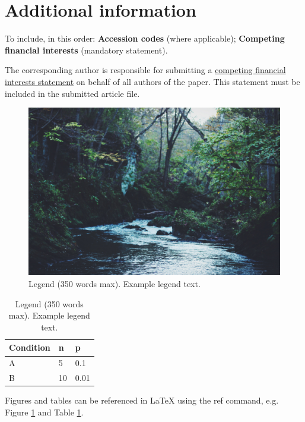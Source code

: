 \documentclass[fleqn,10pt]{./class/wlscirep}
\begin{document}
\section*{Additional information}

To include, in this order: \textbf{Accession codes} (where applicable); \textbf{Competing financial interests} (mandatory statement). 

The corresponding author is responsible for submitting a \href{http://www.nature.com/srep/policies/index.html#competing}{competing financial interests statement} on behalf of all authors of the paper. This statement must be included in the submitted article file.

\begin{figure}[ht]
\centering
\includegraphics[width=\linewidth]{./img/stream}
\caption{Legend (350 words max). Example legend text.}
\label{fig:stream}
\end{figure}

\begin{table}[ht]
\centering
\begin{tabular}{|l|l|l|}
\hline
Condition & n & p \\
\hline
A & 5 & 0.1 \\
\hline
B & 10 & 0.01 \\
\hline
\end{tabular}
\caption{\label{tab:example}Legend (350 words max). Example legend text.}
\end{table}

Figures and tables can be referenced in LaTeX using the ref command, e.g. Figure \ref{fig:stream} and Table \ref{tab:example}.
\end{document}
